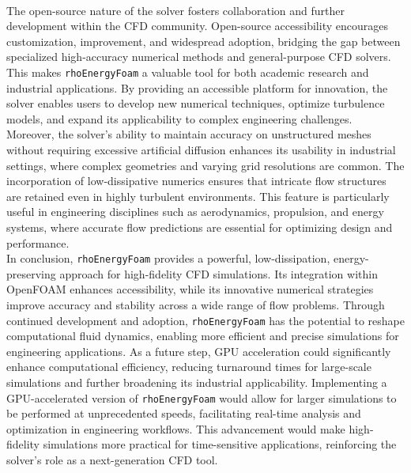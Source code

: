 \documentclass[a5paper]{sapthesis}
\begin{document}
	\\
	The open-source nature of the solver fosters collaboration and further development within the CFD community. Open-source accessibility encourages customization, improvement, and widespread adoption, bridging the gap between specialized high-accuracy numerical methods and general-purpose CFD solvers. This makes \texttt{rhoEnergyFoam} a valuable tool for both academic research and industrial applications. By providing an accessible platform for innovation, the solver enables users to develop new numerical techniques, optimize turbulence models, and expand its applicability to complex engineering challenges.
	\\
	Moreover, the solver’s ability to maintain accuracy on unstructured meshes without requiring excessive artificial diffusion enhances its usability in industrial settings, where complex geometries and varying grid resolutions are common. The incorporation of low-dissipative numerics ensures that intricate flow structures are retained even in highly turbulent environments. This feature is particularly useful in engineering disciplines such as aerodynamics, propulsion, and energy systems, where accurate flow predictions are essential for optimizing design and performance.
	\\
	In conclusion, \texttt{rhoEnergyFoam} provides a powerful, low-dissipation, energy-preserving approach for high-fidelity CFD simulations. Its integration within OpenFOAM enhances accessibility, while its innovative numerical strategies improve accuracy and stability across a wide range of flow problems. Through continued development and adoption, \texttt{rhoEnergyFoam} has the potential to reshape computational fluid dynamics, enabling more efficient and precise simulations for engineering applications. As a future step, GPU acceleration could significantly enhance computational efficiency, reducing turnaround times for large-scale simulations and further broadening its industrial applicability. Implementing a GPU-accelerated version of \texttt{rhoEnergyFoam} would allow for larger simulations to be performed at unprecedented speeds, facilitating real-time analysis and optimization in engineering workflows. This advancement would make high-fidelity simulations more practical for time-sensitive applications, reinforcing the solver’s role as a next-generation CFD tool.
	
	\newpage

	
\end{document}
